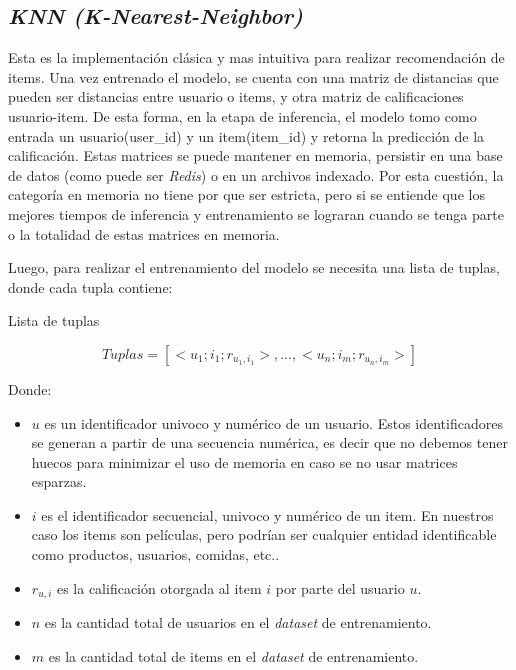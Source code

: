 \documentclass[11pt,a4paper,twoside]{thesis}
\begin{document}
\subsection{\textit{KNN (K-Nearest-Neighbor)}}

Esta es la implementación clásica y mas intuitiva para realizar recomendación
de items. Una vez entrenado el modelo, se cuenta con una matriz de distancias
que pueden ser distancias entre usuario o items, y otra matriz de
calificaciones usuario-item. De esta forma, en la etapa de inferencia, el
modelo tomo como entrada un usuario(user\_id) y un item(item\_id) y retorna la
predicción de la calificación. Estas matrices se puede mantener en memoria,
persistir en una base de datos (como puede ser \textit{Redis}) o en un archivos
indexado. Por esta cuestión, la categoría en memoria no tiene por que ser
estricta, pero si se entiende que los mejores tiempos de inferencia y
entrenamiento se lograran cuando se tenga parte o la totalidad de estas
matrices en memoria.

\clearpage
Luego, para realizar el entrenamiento del modelo se necesita una lista de tuplas, donde cada tupla contiene:

\begin{description}
	\item[Lista de tuplas]
\end{description}
\begin{equation}
	Tuplas = [<u_1; i_1; r_{u_1, i_1}>,...,<u_n; i_m; r_{u_n, i_m}>]
\end{equation}
\begin{description}
	\item[Donde:]
\end{description}
\begin{itemize}
	\item $u$ es un identificador univoco y numérico de un usuario. Estos identificadores se generan a partir de una secuencia numérica, es decir que no debemos tener huecos para minimizar el uso de memoria en caso se no usar matrices esparzas.
	\item $i$ es el identificador secuencial, univoco y numérico de un item. En nuestros caso los items son películas, pero podrían ser cualquier entidad identificable como productos, usuarios, comidas, etc..
	\item $r_{u, i}$ es la calificación otorgada al item $i$ por parte del usuario $u$.
	\item $n$ es la cantidad total de usuarios en el \textit{dataset} de entrenamiento.
	\item $m$ es la cantidad total de items en el \textit{dataset} de entrenamiento.
\end{itemize}
\end{document}
